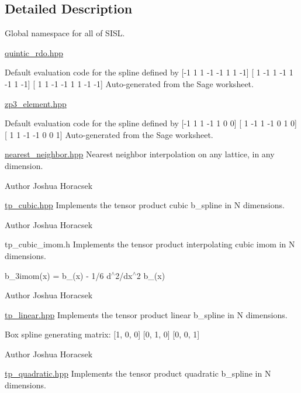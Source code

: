 \subsection{Detailed Description}
Global namespace for all of S\+I\+SL. 

\hyperlink{quintic__rdo_8hpp_source}{quintic\+\_\+rdo.\+hpp}

Default evaluation code for the spline defined by \mbox{[}-\/1 1 1 -\/1 -\/1 1 1 -\/1\mbox{]} \mbox{[} 1 -\/1 1 -\/1 1 -\/1 1 -\/1\mbox{]} \mbox{[} 1 1 -\/1 -\/1 1 1 -\/1 -\/1\mbox{]} Auto-\/generated from the Sage worksheet.

\hyperlink{zp3__element_8hpp_source}{zp3\+\_\+element.\+hpp}

Default evaluation code for the spline defined by \mbox{[}-\/1 1 1 -\/1 1 0 0\mbox{]} \mbox{[} 1 -\/1 1 -\/1 0 1 0\mbox{]} \mbox{[} 1 1 -\/1 -\/1 0 0 1\mbox{]} Auto-\/generated from the Sage worksheet.

\hyperlink{nearest__neighbor_8hpp_source}{nearest\+\_\+neighbor.\+hpp} Nearest neighbor interpolation on any lattice, in any dimension.

\begin{DoxyAuthor}{Author}
Joshua Horacsek
\end{DoxyAuthor}
\hyperlink{tp__cubic_8hpp_source}{tp\+\_\+cubic.\+hpp} Implements the tensor product cubic b\+\_\+spline in \textquotesingle{}N\textquotesingle{} dimensions.

\begin{DoxyAuthor}{Author}
Joshua Horacsek
\end{DoxyAuthor}
tp\+\_\+cubic\+\_\+imom.\+h Implements the tensor product interpolating cubic imom in \textquotesingle{}N\textquotesingle{} dimensions.

b\+\_\+3imom(x) = b\+\_(x) -\/ 1/6 d$^\wedge$2/dx$^\wedge$2 b\+\_(x)

\begin{DoxyAuthor}{Author}
Joshua Horacsek
\end{DoxyAuthor}
\hyperlink{tp__linear_8hpp_source}{tp\+\_\+linear.\+hpp} Implements the tensor product linear b\+\_\+spline in \textquotesingle{}N\textquotesingle{} dimensions.

Box spline generating matrix\+: \mbox{[}1, 0, 0\mbox{]} \mbox{[}0, 1, 0\mbox{]} \mbox{[}0, 0, 1\mbox{]}

\begin{DoxyAuthor}{Author}
Joshua Horacsek
\end{DoxyAuthor}
\hyperlink{tp__quadratic_8hpp_source}{tp\+\_\+quadratic.\+hpp} Implements the tensor product quadratic b\+\_\+spline in \textquotesingle{}N\textquotesingle{} dimensions.

